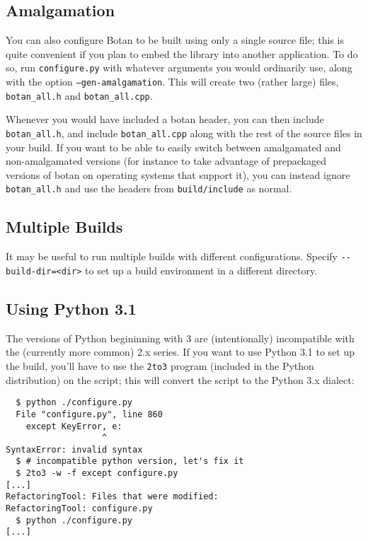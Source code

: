 \documentclass{article}
\newcommand{\filename}[1]{\texttt{#1}}
\begin{document}
\subsection{Amalgamation}

You can also configure Botan to be built using only a single source
file; this is quite convenient if you plan to embed the library into
another application. To do so, run \filename{configure.py} with
whatever arguments you would ordinarily use, along with the option
\texttt{--gen-amalgamation}. This will create two (rather large)
files, \filename{botan\_all.h} and \filename{botan\_all.cpp}.

Whenever you would have included a botan header, you can then include
\filename{botan\_all.h}, and include \filename{botan\_all.cpp} along
with the rest of the source files in your build. If you want to be
able to easily switch between amalgamated and non-amalgamated versions
(for instance to take advantage of prepackaged versions of botan on
operating systems that support it), you can instead ignore
\filename{botan\_all.h} and use the headers from
\filename{build/include} as normal.

\subsection{Multiple Builds}

It may be useful to run multiple builds with different
configurations. Specify \verb|--build-dir=<dir>| to set up a build
environment in a different directory.

\subsection{Using Python 3.1}

The versions of Python begininning with 3 are (intentionally)
incompatible with the (currently more common) 2.x series. If you want
to use Python 3.1 to set up the build, you'll have to use the
\texttt{2to3} program (included in the Python distribution) on the
script; this will convert the script to the Python 3.x dialect:

\begin{verbatim}
  $ python ./configure.py
  File "configure.py", line 860
    except KeyError, e:
                   ^
SyntaxError: invalid syntax
  $ # incompatible python version, let's fix it
  $ 2to3 -w -f except configure.py
[...]
RefactoringTool: Files that were modified:
RefactoringTool: configure.py
  $ python ./configure.py
[...]
\end{verbatim}
\end{document}

